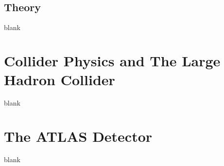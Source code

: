 \documentclass[11pt]{report}
\begin{document}
\listoftables

\newpage\listoffigures



\newpage
\endofprelim



\section{Theory}
\label{sec:theory}
blank
%

\chapter{Collider Physics and The Large Hadron Collider}
\label{sec:lhc}
blank
%

\chapter{The ATLAS Detector}
\label{sec:atlas}
blank
%








\newpage
\singlespace


\end{document}
